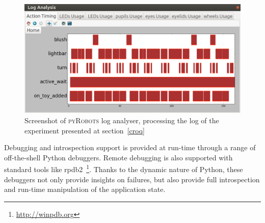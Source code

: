 \documentclass[a4paper, 10pt, conference]{ieeeconf}      %
\newcommand{\pyRobots}{\textsc{pyRobots}}
\begin{document}
\begin{figure}
        \centering
        \includegraphics[width=0.9\columnwidth]{log}
        \caption{Screenshot of \pyRobots{} log analyser, processing the log of the
        experiment presented at section~\ref{croq}}
        \label{log_view}
\end{figure}

Debugging and introspection support is provided at run-time through a range of
off-the-shell Python debuggers. Remote debugging is also supported with standard
tools like {\sc rpdb2}~\footnote{\url{http://winpdb.org}}. Thanks to the dynamic
nature of Python, these debuggers not only provide insights on failures, but
also provide full introspection and run-time manipulation of the application
state.
\end{document}
